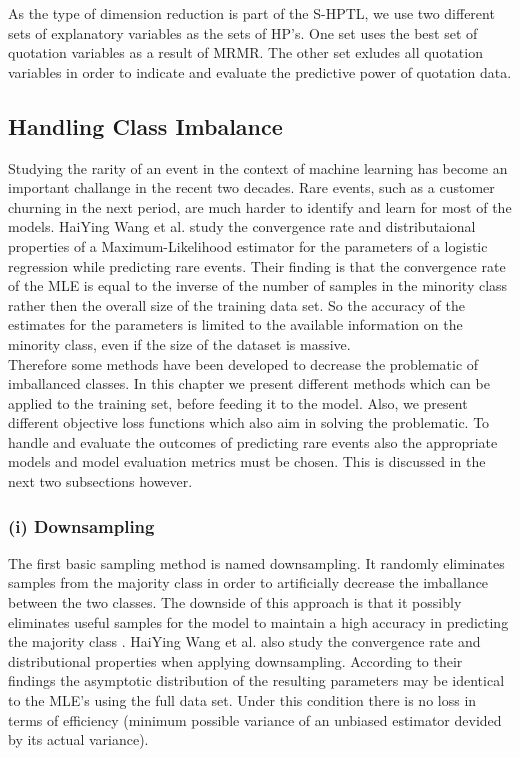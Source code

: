 \documentclass[12pt,titlepage]{article}
\begin{document}
As the type of dimension reduction is part of the S-HPTL, we use two different sets of explanatory variables as the sets of HP's. One set uses the best set of quotation variables as a result of MRMR. The other set exludes all quotation variables in order to indicate and evaluate the predictive power of quotation data. \\

\subsection{Handling Class Imbalance} \par

Studying the rarity of an event in the context of machine learning has become an important challange in the recent two decades. Rare events, such as a customer churning in the next period, are much harder to identify and learn for most of the models. HaiYing Wang et al. \cite{convergence_rareevents} study the convergence rate and distributaional properties of a Maximum-Likelihood estimator for the parameters of a logistic regression while predicting rare events. Their finding is that the convergence rate of the MLE is equal to the inverse of the number of samples in the minority class rather then the overall size of the training data set. So the accuracy of the estimates for the parameters is limited to the available information on the minority class, even if the size of the dataset is massive. \\
Therefore some methods have been developed to decrease the problematic of imballanced classes. In this chapter we present different methods which can be applied to the training set, before feeding it to the model. Also, we present different objective loss functions which also aim in solving the problematic. To handle and evaluate the outcomes
of predicting rare events also the appropriate models and model evaluation metrics must be chosen. This is discussed in the next two subsections however. \\

\subsubsection*{(i) Downsampling}

The first basic sampling method is named downsampling. It randomly eliminates samples from the majority class in order to artificially decrease the imballance between the two classes. The downside of this approach is that it possibly eliminates useful samples for the model to maintain a high accuracy in predicting the majority class \cite{mining_rarity}. HaiYing Wang et al. also study the convergence rate and distributional properties when applying downsampling. According to their findings the asymptotic distribution of the resulting parameters may be identical to the MLE's using the full data set. Under this condition there is no loss in terms of efficiency (minimum possible variance of an unbiased estimator devided by its actual variance). \\
\end{document}

